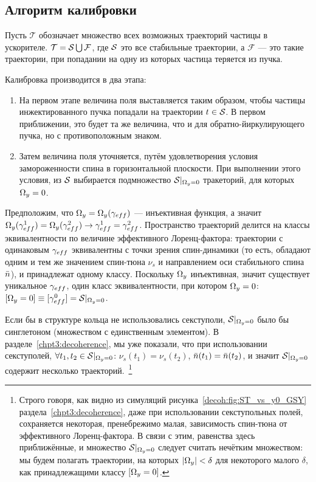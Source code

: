 
\newcommand{\Traj}{\mathcal T}
\newcommand{\Fail}{\mathcal F}
\newcommand{\CO}{\mathrm{CO}}


\subsection{Алгоритм калибровки}
Пусть $\Traj$ обозначает множество всех возможных траекторий частицы в ускорителе. $\Traj = \Stab \bigcup \Fail$,
где $\Stab$ это все стабильные траектории, а $\Fail$ --- это такие траектории,
при попадании на одну из которых частица теряется из пучка.

Калибровка производится в два этапа:
\begin{enumerate}
\item На первом этапе величина поля выставляется таким образом, чтобы частицы инжектированного пучка
попадали на траектории $t\in \Stab$. В первом приближении, это будет та же величина,
что и для обратно-йиркулирующего пучка, но с противоположным знаком.
\item Затем величина поля уточняется, путём удовлетворения условия замороженности спина в горизонтальной
плоскости. При выполнении этого условия, из $\Stab$ выбирается подмножество $\Stab*$ тракеторий, для которых
$\Omega_y = 0$.
\end{enumerate}

Предположим, что $\W_y = \W_y(\g*)$ --- инъективная функция, а значит
$\W_y(\g*^1) = \W_y(\g*^2) \rightarrow \g*^1 = \g*^2$. Пространство траекторий делится на
классы эквивалентности по величине эффективного Лоренц-фактора: траектории с одинаковым $\g*$ эквивалентны
с точки зрения спин-динамики (то есть, обладают одним и тем же значением спин-тюна $\nu_s$ и направлением
оси стабильного спина $\bar n$), и принадлежат одному классу. Поскольку $\Omega_y$ инъективная, значит существует
уникальное $\g*$, один класс эквивалентности, при котором $\Omega_y=0$: $[\W_y=0]\equiv [\g*^0] = \Stab*$.

Если бы в структуре кольца не использовались секступоли, $\Stab*$ было бы синглетоном (множеством с
единственным элементом). В разделе~\ref{chpt3:decoherence}, мы уже показали, что
при использовании секступолей, $\forall t_1,t_2\in\Stab*$:
$\nu_s(t_1) = \nu_s(t_2)$, $\bar n(t_1) = \bar n(t_2)$, и значит $\Stab*$ содержит
несколько траекторий.~\footnote{Строго говоря, как видно из симуляций рисунка~\ref{decoh:fig:ST_vs_y0_GSY}
раздела~\ref{chpt3:decoherence}, даже при использовании секступольных полей, сохраняется некоторая,
пренебрежимо малая, зависимость спин-тюна от эффективного Лоренц-фактора. В связи с этим, равенства
здесь приближённые, и множество $\Stab*$ следует считать нечётким множеством: мы будем полагать траектории,
на которых $|\Omega_y| < \delta$ для некоторого малого $\delta$, как принадлежащими классу $[\Omega_y=0]$.}

